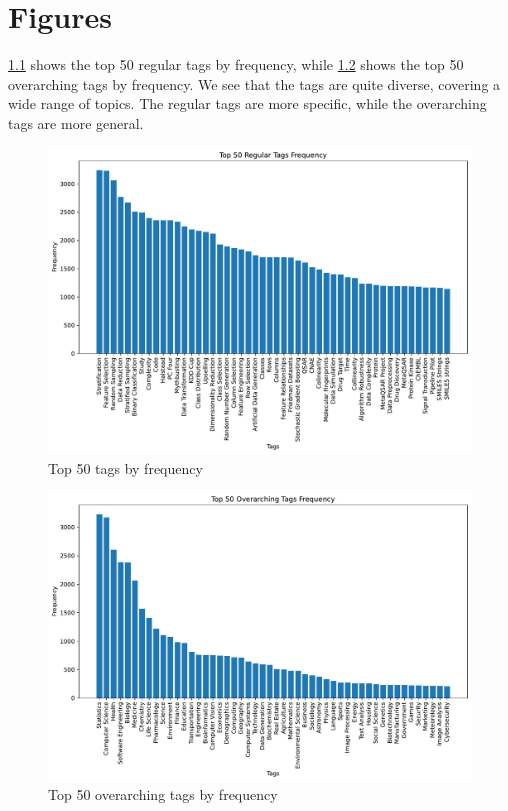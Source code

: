 \chapter{Figures}\label{sec:figures_appendix}

\cref{fig:top_50_frequency} shows the top 50 regular tags by frequency, while \cref{fig:top_50_overarching_frequency} shows the top 50 overarching tags by frequency. We see that the tags are quite diverse, covering a wide range of topics. The regular tags are more specific, while the overarching tags are more general.

\begin{figure}[h]
    \centering
    \includegraphics[width=\textwidth]{figures/top_50_frequency.pdf}
    \caption{Top 50 tags by frequency}
    \label{fig:top_50_frequency}
\end{figure}

\begin{figure}[h]
    \centering
    \includegraphics[width=\textwidth]{figures/top_50_overarching_frequency.pdf}
    \caption{Top 50 overarching tags by frequency}
    \label{fig:top_50_overarching_frequency}
\end{figure}

